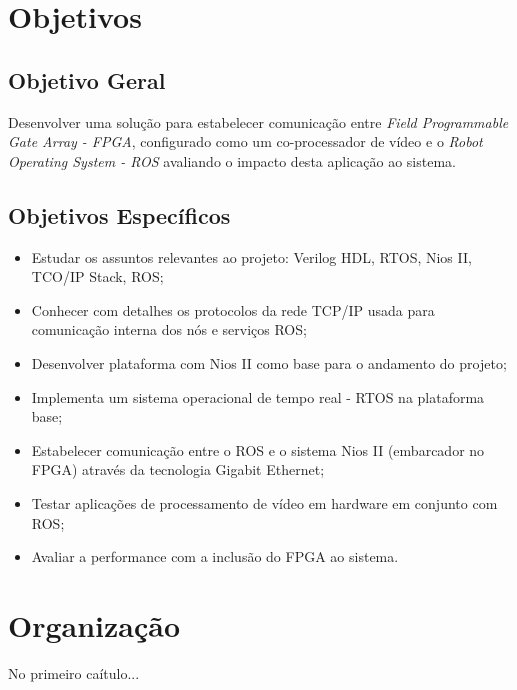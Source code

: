 
\section{Objetivos}

\subsection{Objetivo Geral}

Desenvolver uma solução para estabelecer comunicação entre \textit{Field Programmable Gate Array - FPGA}, 
configurado como um co-processador de vídeo e o  \textit{Robot Operating System - ROS} avaliando 
o impacto desta aplicação ao sistema.

\subsection{Objetivos Específicos}

\begin{itemize}
    \item Estudar os assuntos relevantes ao projeto: Verilog HDL, RTOS, Nios II, TCO/IP Stack, ROS;
    \item Conhecer com detalhes os protocolos da rede TCP/IP usada para comunicação interna dos nós e serviços ROS;
    \item Desenvolver plataforma com Nios II como base para o andamento do projeto;
    \item Implementa um sistema operacional de tempo real - RTOS na plataforma base;
    \item Estabelecer comunicação entre o ROS e o sistema Nios II (embarcador no FPGA) através da tecnologia Gigabit Ethernet;
    \item Testar aplicações de processamento de vídeo em hardware em conjunto com ROS;
    \item Avaliar a performance com a inclusão do FPGA ao sistema.
\end{itemize}


\section{Organização}

 No primeiro caítulo...